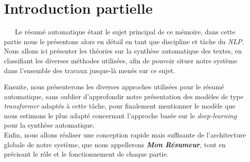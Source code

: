 \section{Introduction partielle}
$ _{} $ $ _{} $ $ _{} $ $ _{} $ $ _{} $Le résumé automatique étant le sujet principal de ce mémoire, dans cette partie nous le présentons alors en détail en tant que discipline et tâche du \textit{NLP}. Nous allons ici présenter les théories sur la synthèse automatique des textes, en classifiant les diverses méthodes utilisées, afin de pouvoir situer notre système dans l'ensemble des travaux jusque-là menés sur ce sujet.

Ensuite, nous présenterons les diverses approches utilisées pour le résumé automatique, sans oublier d'approfondir notre présentation des modèles de type \textit{transformer} adaptés à cette tâche, pour finalement mentionner le modèle que nous estimons le plus adapté concernant l'approche basée sur le \textit{deep-learning} pour la synthèse automatique.\\
Enfin, nous allons réaliser une conception rapide mais suffisante de l'architecture globale de notre système, que nous appellerons \textbf{\textit{Mon Résumeur}}, tout en précisant le rôle et le fonctionnement de chaque partie.
